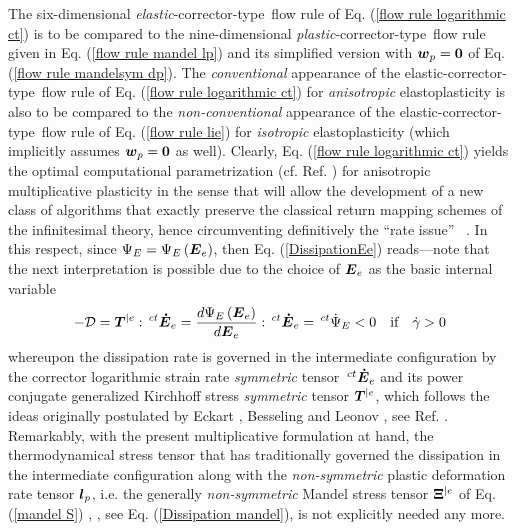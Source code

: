 \documentclass[preprint,review,12pt,sort&compress]{elsarticle}%
\renewcommand{\mathbf}[1]{\mbox{\boldmath $#1$ \unboldmath}  \!\!}
\begin{document}
The six-dimensional \emph{elastic}-corrector-type\ flow rule of Eq.
(\ref{flow rule logarithmic ct}) is to be compared to the nine-dimensional
\emph{plastic}-corrector-type\ flow rule given in Eq.
(\ref{flow rule mandel lp}) and its simplified version with $\mathbf{w}%
_{p}=\mathbf{0}$ of Eq. (\ref{flow rule mandelsym dp}). The
\emph{conventional} appearance of the elastic-corrector-type\ flow rule of Eq.
(\ref{flow rule logarithmic ct}) for \emph{anisotropic} elastoplasticity is
also to be compared to the \emph{non-conventional} appearance of the
elastic-corrector-type\ flow rule of Eq. (\ref{flow rule lie}) for
\emph{isotropic} elastoplasticity (which implicitly assumes $\mathbf{w}%
_{p}=\mathbf{0}$ as well). Clearly, Eq. (\ref{flow rule logarithmic ct})
yields the optimal computational parametrization (cf. Ref. \cite{LatMonCM2015}%
) for anisotropic multiplicative plasticity in the sense that will allow the
development of a new class of algorithms that exactly preserve the classical
return mapping schemes of the infinitesimal theory, hence circumventing
definitively the \textquotedblleft rate issue\textquotedblright\ \cite{Simo92}%
. In this respect, since $\Psi_{E}=\Psi_{E}\left(  \mathbf{E}_{e}\right)  $,
then Eq. (\ref{DissipationEe}) reads---note that the next interpretation is
possible due to the choice of $\mathbf{E}_{e}$ as the basic internal variable%
\begin{equation}
-\mathcal{D}=\mathbf{T}^{|e}:\,^{ct}\mathbf{\dot{E}}_{e}=\frac{d\Psi
_{E}\left(  \mathbf{E}_{e}\right)  }{d\mathbf{E}_{e}}:\,^{ct}\mathbf{\dot{E}%
}_{e}=\,^{ct}\dot{\Psi}_{E}<0\quad\text{if}\quad\dot{\gamma}>0
\label{-DissipationEe}%
\end{equation}
whereupon the dissipation rate is governed in the intermediate configuration
by the corrector logarithmic strain rate \emph{symmetric} tensor
$\,^{ct}\mathbf{\dot{E}}_{e}$ and its power conjugate generalized Kirchhoff
stress \emph{symmetric} tensor $\mathbf{T}^{|e}$, which follows the ideas
originally postulated by Eckart \cite{Eckart48}, Besseling \cite{Besseling66}
and Leonov \cite{Leonov76}, see Ref. \cite{Rubin16}. Remarkably, with the
present multiplicative formulation at hand, the thermodynamical stress tensor
that has traditionally governed the dissipation in the intermediate
configuration along with the \emph{non-symmetric} plastic deformation rate
tensor $\mathbf{l}_{p}$, i.e. the generally \emph{non-symmetric} Mandel stress
tensor $\mathbf{\Xi}^{|e}$ of Eq. (\ref{mandel S}) \cite{Mandel72},
\cite{Mandel74}, see Eq. (\ref{Dissipation mandel}), is not explicitly needed
any more.
\end{document}
